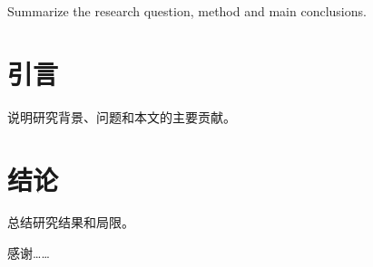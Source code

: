 \documentclass[degree=master]{thuthesis}
\begin{document}
\maketitle
\copyrightpage

\frontmatter
\begin{abstract}
  概括论文的研究问题、方法和主要结论。
\end{abstract}

\begin{abstract*}
  Summarize the research question, method and main conclusions.
\end{abstract*}

\tableofcontents

\mainmatter
\chapter{引言}
说明研究背景、问题和本文的主要贡献。

\chapter{结论}
总结研究结果和局限。



\backmatter
\begin{acknowledgements}
  感谢……
\end{acknowledgements}

\statement
\end{document}
